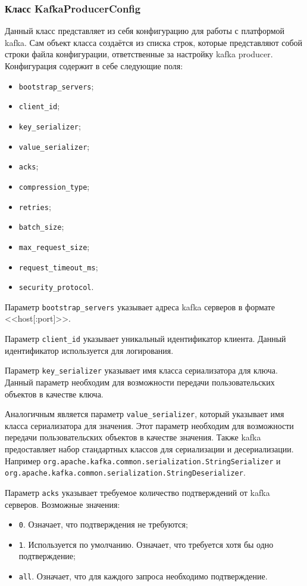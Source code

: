 \subsubsection{Класс KafkaProducerConfig}

Данный класс представляет из себя конфигурацию для работы с платформой kafka.
Сам объект класса создаётся из списка строк, которые представляют собой строки файла конфигурации, ответственные за настройку kafka producer.
Конфигурация содержит в себе следующие поля:
\begin{itemize}
    \item \texttt{bootstrap\_servers};
    \item \texttt{client\_id};
    \item \texttt{key\_serializer};
    \item \texttt{value\_serializer};
    \item \texttt{acks};
    \item \texttt{compression\_type};
    \item \texttt{retries};
    \item \texttt{batch\_size};
    \item \texttt{max\_request\_size};
    \item \texttt{request\_timeout\_ms};
    \item \texttt{security\_protocol}.
\end{itemize}

Параметр \texttt{bootstrap\_servers} указывает адреса kafka серверов в формате <<host[:port]>>.

Параметр \texttt{client\_id} указывает уникальный идентификатор клиента.
Данный идентификатор используется для логирования.

Параметр \texttt{key\_serializer} указывает имя класса сериализатора для ключа.
Данный параметр необходим для возможности передачи пользовательских объектов в качестве ключа.

Аналогичным является параметр \texttt{value\_serializer}, который указывает имя класса сериализатора для значения.
Этот параметр необходим для возможности передачи пользовательских объектов в качестве значения.
Также kafka предоставляет набор стандартных классов для сериализации и десериализации.
Например \texttt{org.apache.kafka.common.serialization.StringSerializer} и \texttt{org.apache.kafka.common.serialization.StringDeserializer}.

Параметр \texttt{acks} указывает требуемое количество подтверждений от kafka серверов.
Возможные значения:
\begin{itemize}
    \item \texttt{0}. Означает, что подтверждения не требуются;
    \item \texttt{1}. Используется по умолчанию. Означает, что требуется хотя бы одно подтверждение;
    \item \texttt{all}. Означает, что для каждого запроса необходимо подтверждение.
\end{itemize}

